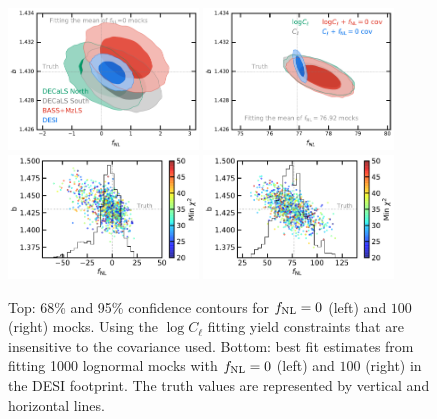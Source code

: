 \begin{figure}
    \centering
    \includegraphics[width=0.45\textwidth]{figures/mcmc_zero.pdf} 
    \includegraphics[width=0.45\textwidth]{figures/mcmc_po100.pdf} 
    \includegraphics[width=0.45\textwidth]{figures/bestfit_zero.pdf} 
    \includegraphics[width=0.45\textwidth]{figures/bestfit_po100.pdf}         
    \caption{Top: 68\% and 95\% confidence contours for $f_{\rm NL}=0$ (left) and $100$ (right) mocks. Using the $\log C_{\ell}$ fitting yield constraints that are insensitive to the covariance used. Bottom: best fit estimates from fitting 1000 lognormal mocks with $f_{\rm NL}=0$ (left) and $100$ (right) in the DESI footprint. The truth values are represented by vertical and horizontal lines.}\label{fig:mcmc_mocks}
\end{figure}



